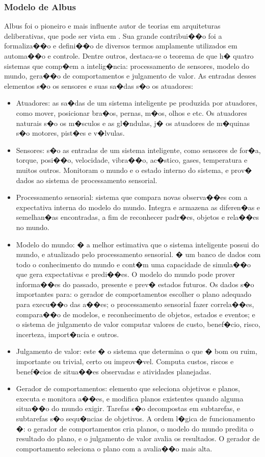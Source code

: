 \subsubsection{Modelo de Albus}

Albus foi o pioneiro e mais influente autor de teorias em arquiteturas
deliberativas, que pode ser vista em \cite{albus1991outline}. Sua
grande contribui��o foi a formaliza��o e defini��o de diversos termos
amplamente utilizados em automa��o e controle. Dentre outros, destaca-se o
teorema de que h� quatro sistemas que comp�em a intelig�ncia: processamento de
sensores, modelo do mundo, gera��o de comportamentos e julgamento de valor. As
entradas desses elementos s�o os sensores e suas sa�das s�o os atuadores:

\begin{itemize}
  \item Atuadores: as sa�das de um sistema inteligente pe produzida por
  atuadores, como mover, posicionar bra�os, pernas, m�os, olhos e etc. Os
  atuadores naturais s�o os m�sculos e as gl�ndulas, j� os atuadores de m�quinas
  s�o motores, pist�es e v�lvulas.
  \item Sensores: s�o as entradas de um sistema inteligente, como sensores de
  for�a, torque, posi��o, velocidade, vibra��o, ac�stico, gases, temperatura e
  muitos outros. Monitoram o mundo e o estado interno do sistema, e prov� dados
  ao sistema de processamento sensorial.
  \item Processamento sensorial: sistema que compara novas observa��es com a
  expectativa interna do modelo do mundo. Integra e armazena as diferen�as e
  semelhan�as encontradas, a fim de reconhecer padr�es, objetos e rela��es no
  mundo.
  \item Modelo do mundo: � a melhor estimativa que o sistema inteligente possui
  do mundo, e atualizado pelo processamento sensorial. � um banco de dados com
  todo o conhecimento do mundo e cont�m uma capacidade de simula��o que gera expectativas e predi��es. O modelo do mundo
  pode prover informa��es do passado, presente e prev� estados futuros.
  Os dados s�o importantes para: o gerador de comportamentos escolher o plano
  adequado para execu��o das a��es; o processamento sensorial fazer correla��es,
  compara��o de modelos, e reconhecimento de objetos, estados e eventos; e o
  sistema de julgamento de valor computar valores de custo, benef�cio, risco,
  incerteza, import�ncia e outros.
  \item Julgamento de valor: este � o sistema que determina o que � bom ou ruim,
  importante ou trivial, certo ou improv�vel. Computa custos, riscos e
  benef�cios de situa��es observadas e atividades planejadas.
  \item Gerador de comportamentos: elemento que seleciona objetivos e planos,
  executa e monitora a��es, e modifica planos existentes quando alguma situa��o
  do mundo exigir. Tarefas s�o decompostas em subtarefas, e subtarefas s�o
  sequ�ncias de objetivos. A ordem l�gica de funcionamento �: o gerador de
  comportamentos cria planos, o modelo do mundo predita o resultado do plano, e
  o julgamento de valor avalia os resultados. O gerador de comportamento
  seleciona o plano com a avalia��o mais alta.
\end{itemize}
